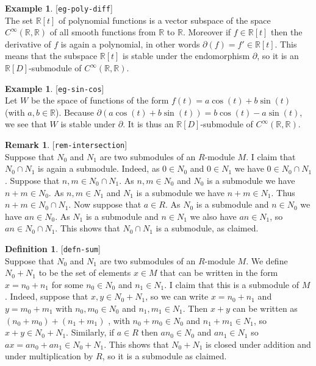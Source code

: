 \documentclass{amsart}
\newcommand{\lbl}[1]{\label{#1}\textup{[\texttt{#1}]}\ \\}
\newcommand{\lbl}{\label}
\newcommand{\R}         {{\mathbb{R}}}
\newcommand{\CRR}       {C^\infty(\R,\R)}
\renewcommand{\:}{\colon}
\theoremstyle{definition}
\newtheorem{remark}[theorem]{Remark}
\newtheorem{definition}[theorem]{Definition}
\newtheorem{example}[theorem]{Example}
\begin{document}
\begin{example}\lbl{eg-poly-diff}
 The set $\R[t]$ of polynomial functions is a vector subspace of the
 space $\CRR$ of all smooth functions from $\R$ to $\R$.  Moreover if
 $f\in\R[t]$ then the derivative of $f$ is again a polynomial, in
 other words $\partial(f)=f'\in\R[t]$.  This means that the subspace
 $\R[t]$ is stable under the endomorphism $\partial$, so it is an
 $\R[D]$-submodule of $\CRR$.
\end{example}
\begin{example}\lbl{eg-sin-cos}
 Let $W$ be the space of functions of the form
 $f(t)=a\cos(t)+b\sin(t)$ (with $a,b\in\R$).  Because
 $\partial(a\cos(t)+b\sin(t))=b\cos(t)-a\sin(t)$, we see that $W$ is
 stable under $\partial$.  It is thus an $\R[D]$-submodule of $\CRR$.
\end{example}

\begin{remark}\lbl{rem-intersection}
 Suppose that $N_0$ and $N_1$ are two submodules of an $R$-module $M$.
 I claim that $N_0\cap N_1$ is again a submodule.  Indeed, as $0\in
 N_0$ and $0\in N_1$ we have $0\in N_0\cap N_1$.  Suppose that $n,m\in
 N_0\cap N_1$.  As $n,m\in N_0$ and $N_0$ is a submodule we have
 $n+m\in N_0$.  As $n,m\in N_1$ and $N_1$ is a submodule we have
 $n+m\in N_1$.  Thus $n+m\in N_0\cap N_1$.  Now suppose that
 $a\in R$.  As $N_0$ is a submodule and $n\in N_0$ we have
 $an\in N_0$.  As $N_1$ is a submodule and $n\in N_1$ we also have
 $an\in N_1$, so $an\in N_0\cap N_1$.  This shows that $N_0\cap N_1$
 is a submodule, as claimed.
\end{remark}

\begin{definition}\lbl{defn-sum}
 Suppose that $N_0$ and $N_1$ are two submodules of an $R$-module $M$.
 We define $N_0+N_1$ to be the set of elements $x\in M$ that can be
 written in the form $x=n_0+n_1$ for some $n_0\in N_0$ and
 $n_1\in N_1$.  I claim that this is a submodule of $M$.  Indeed,
 suppose that $x,y\in N_0+N_1$, so we can write $x=n_0+n_1$ and
 $y=m_0+m_1$ with $n_0,m_0\in N_0$ and $n_1,m_1\in N_1$.  Then
 $x+y$ can be written as $(n_0+m_0)+(n_1+m_1)$ , with $n_0+m_0\in N_0$
 and $n_1+m_1\in N_1$, so $x+y\in N_0+N_1$.  Similarly, if $a\in R$
 then $an_0\in N_0$ and $an_1\in N_1$ so $ax=an_0+an_1\in N_0+N_1$.
 This shows that $N_0+N_1$ is closed under addition and under
 multiplication by $R$, so it is a submodule as claimed.
\end{definition}
\end{document}
